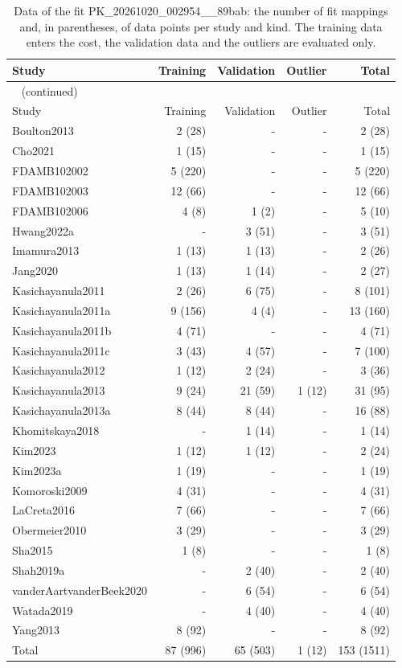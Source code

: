 \begin{longtable}{lrrrr}
\caption{Data of the fit PK\_20261020\_002954\_\_89bab: the number of fit mappings and, in parentheses, of data points per study and kind. The training data enters the cost, the validation data and the outliers are evaluated only.}\label{tab:data:PK_20261020_002954__89bab} \\
\toprule
Study & Training & Validation & Outlier & Total \\
\midrule
\endfirsthead
\multicolumn{5}{l}{\small\tablename~\thetable{} (continued)} \\
\toprule
Study & Training & Validation & Outlier & Total \\
\midrule
\endhead
\bottomrule
\endlastfoot
Boulton2013 & 2 (28) & - & - & 2 (28) \\
Cho2021 & 1 (15) & - & - & 1 (15) \\
FDAMB102002 & 5 (220) & - & - & 5 (220) \\
FDAMB102003 & 12 (66) & - & - & 12 (66) \\
FDAMB102006 & 4 (8) & 1 (2) & - & 5 (10) \\
Hwang2022a & - & 3 (51) & - & 3 (51) \\
Imamura2013 & 1 (13) & 1 (13) & - & 2 (26) \\
Jang2020 & 1 (13) & 1 (14) & - & 2 (27) \\
Kasichayanula2011 & 2 (26) & 6 (75) & - & 8 (101) \\
Kasichayanula2011a & 9 (156) & 4 (4) & - & 13 (160) \\
Kasichayanula2011b & 4 (71) & - & - & 4 (71) \\
Kasichayanula2011c & 3 (43) & 4 (57) & - & 7 (100) \\
Kasichayanula2012 & 1 (12) & 2 (24) & - & 3 (36) \\
Kasichayanula2013 & 9 (24) & 21 (59) & 1 (12) & 31 (95) \\
Kasichayanula2013a & 8 (44) & 8 (44) & - & 16 (88) \\
Khomitskaya2018 & - & 1 (14) & - & 1 (14) \\
Kim2023 & 1 (12) & 1 (12) & - & 2 (24) \\
Kim2023a & 1 (19) & - & - & 1 (19) \\
Komoroski2009 & 4 (31) & - & - & 4 (31) \\
LaCreta2016 & 7 (66) & - & - & 7 (66) \\
Obermeier2010 & 3 (29) & - & - & 3 (29) \\
Sha2015 & 1 (8) & - & - & 1 (8) \\
Shah2019a & - & 2 (40) & - & 2 (40) \\
vanderAartvanderBeek2020 & - & 6 (54) & - & 6 (54) \\
Watada2019 & - & 4 (40) & - & 4 (40) \\
Yang2013 & 8 (92) & - & - & 8 (92) \\
Total & 87 (996) & 65 (503) & 1 (12) & 153 (1511) \\
\end{longtable}

